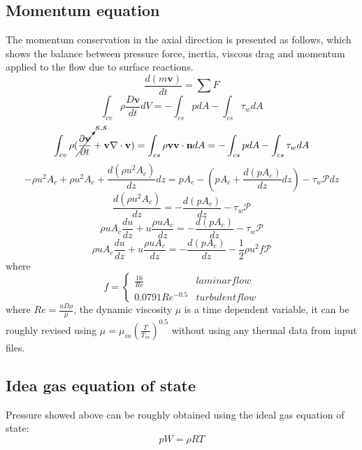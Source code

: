 \documentclass[11pt]{article}
\begin{document}
\subsection{Momentum equation}
The momentum conservation in the axial direction is presented as follows, which shows the balance between pressure force, inertia, viscous drag and momentum applied to the flow due to surface reactions\cite{kee2005chemically,larson1996plug}.
\begin{equation}
    \frac{d(m\textbf{v})}{dt} = \sum F
\end{equation}
\begin{equation}
    \int_{cv}\rho \frac{D\textbf{v}}{dt}dV = -\int_{cs}pdA - \int_{cs}\tau_wdA
\end{equation}
\begin{equation}
    \int_{cv}\rho (\cancelto{s.s}{\frac{\partial \textbf{v}}{\partial t}} + \textbf{v} \nabla\cdot \textbf{v}) =\int_{cs}\rho \textbf{v}\textbf{v}\cdot \textbf{n}dA = -\int_{cs}pdA - \int_{cs}\tau_wdA
\end{equation}
\begin{equation}
    -\rho u^2A_c + \rho u^2A_c + \frac{d(\rho u^2A_c)}{dz}dz = pA_c - (pA_c+\frac{d(pA_c)}{dz}dz) - \tau_w\mathscr{P}dz
\end{equation}
\begin{equation}
    \frac{d(\rho u^2A_c)}{dz} = -\frac{d(pA_c)}{dz} - \tau_w\mathscr{P}
\end{equation}
\begin{equation}
    \rho u A_c\frac{du}{dz} + u\frac{\rho u A_c}{dz} = -\frac{d(pA_c)}{dz} - \tau_w\mathscr{P}
\end{equation}
\begin{equation}
    \boxed{\rho u A_c\frac{du}{dz} + u\frac{\rho u A_c}{dz} = -\frac{d(pA_c)}{dz} - \frac{1}{2}\rho u^2f\mathscr{P}}
\end{equation}
where\[
  f =
  \begin{cases}
                                   \frac{16}{Re} & laminar flow  \\
                                    0.0791 Re^{-0.5} & turbulent flow

  \end{cases}
\]
where $Re = \frac{uD\rho}{\mu}$, the dynamic viscosity $\mu$ is a time dependent variable, it can be roughly revised using $\mu = \mu_{in}(\frac{T}{T_{in}})^{0.5}$ without using any thermal data from input files.
\subsection{Idea gas equation of state}
Pressure showed above  can be roughly obtained using the ideal gas equation of state:
\begin{equation}
    pW = \rho RT
\end{equation}
\end{document}
